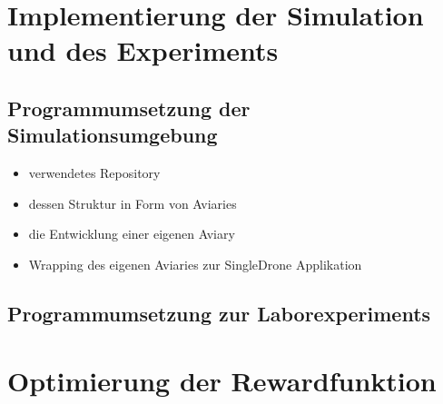 \section{Implementierung der Simulation und des Experiments}
\subsection{Programmumsetzung der Simulationsumgebung}
\begin{itemize}
    \item verwendetes Repository
    \item dessen Struktur in Form von Aviaries
    \item die Entwicklung einer eigenen Aviary 
    \item Wrapping des eigenen Aviaries zur SingleDrone Applikation
\end{itemize}
\subsection{Programmumsetzung zur Laborexperiments}
\section{Optimierung der Rewardfunktion}
